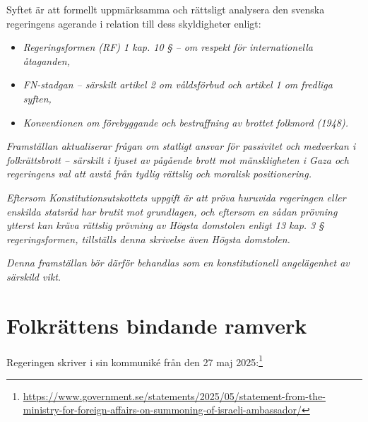 \documentclass[12pt]{article}
\begin{document}
\begin{spacing}{1.2}

Syftet är att formellt uppmärksamma och rättsligt analysera den svenska regeringens agerande i relation till dess skyldigheter enligt:

\begin{itemize}
  \item \textit{Regeringsformen (RF) 1 kap. 10 § – om respekt för internationella åtaganden,}
  \item \textit{FN-stadgan – särskilt artikel 2 om våldsförbud och artikel 1 om fredliga syften,}
  \item \textit{Konventionen om förebyggande och bestraffning av brottet folkmord (1948).}
\end{itemize}

\vspace{0.5cm}
\textit{
Framställan aktualiserar frågan om statligt ansvar för passivitet och medverkan i folkrättsbrott – särskilt i ljuset av pågående brott mot mänskligheten i Gaza och regeringens val att avstå från tydlig rättslig och moralisk positionering.
}

\vspace{0.5cm}
\textit{
Eftersom Konstitutionsutskottets uppgift är att pröva huruvida regeringen eller enskilda statsråd har brutit mot grundlagen, och eftersom en sådan prövning ytterst kan kräva rättslig prövning av Högsta domstolen enligt 13 kap. 3 § regeringsformen, tillställs denna skrivelse även Högsta domstolen.
}

\vspace{0.5cm}
\textit{
Denna framställan bör därför behandlas som en konstitutionell angelägenhet av särskild vikt.
}
\end{spacing}

\newpage

\tableofcontents
\newpage




\section{Folkrättens bindande ramverk}



Regeringen skriver i sin kommuniké från den 27 maj 2025:\footnote{\url{https://www.government.se/statements/2025/05/statement-from-the-ministry-for-foreign-affairs-on-summoning-of-israeli-ambassador/}}
\end{document}

